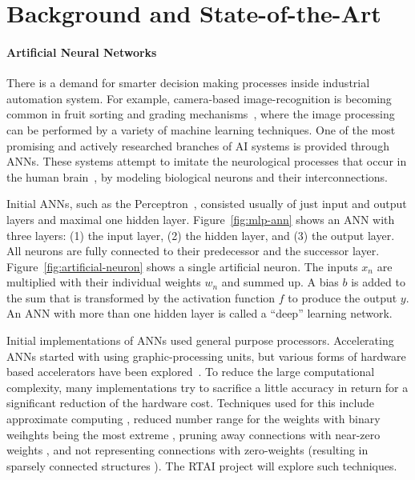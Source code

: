 \documentclass[fleqn,12pt]{article}
\begin{document}
\section{Background and State-of-the-Art}
\label{sec:background}


\paragraph{Artificial Neural Networks}

There is a demand for smarter decision making processes inside industrial automation system.
For example, camera-based image-recognition is becoming common in fruit sorting and grading mechanisms~\cite{vibhute2012applications,AutomaticFruitAndVegetableClassificationFromImages}, where the image processing can be performed by a variety of machine learning techniques.
One of the most promising and actively researched branches of AI systems is provided through
ANNs.
These systems attempt to imitate the neurological processes that occur in the human brain~\cite{bishop1995neural}, by modeling biological neurons and their interconnections.

%	
%
%	

Initial ANNs, such as the Perceptron~\cite{theperceptron58}, consisted usually of just
input and output layers and maximal one hidden layer.
Figure~\ref{fig:mlp-ann} shows an ANN with three layers: (1) the input layer, (2)
the hidden layer, and (3) the output layer. All neurons are fully connected to their
predecessor and the successor layer.
Figure~\ref{fig:artificial-neuron} shows a single artificial neuron. The inputs $x_n$
are multiplied with their individual weights $w_n$ and summed up. A bias $b$ is added
to the sum that is transformed by the activation function $f$ to produce the output $y$.
An ANN with more than one hidden layer is called a ``deep'' learning network.

Initial implementations of ANNs used general purpose processors. Accelerating ANNs started
with using graphic-processing units, but various forms of hardware based accelerators
have been explored~\cite{Wang:2019:DNN,Sze2017a,Moons2019}. To reduce the large computational
complexity, many implementations try to sacrifice a little accuracy in return for a
significant reduction of the hardware cost. Techniques used for this include approximate
computing \cite{Moons2016a}, reduced number range for the weights with binary weihghts
being the most extreme \cite{Moons2018a}, pruning away connections with near-zero
weights \cite{Zhu2017}, and not representing connections with zero-weights (resulting in
sparsely connected structures \cite{Mao2017,narang2017b}). The RTAI project will explore
such techniques.  
\end{document}
